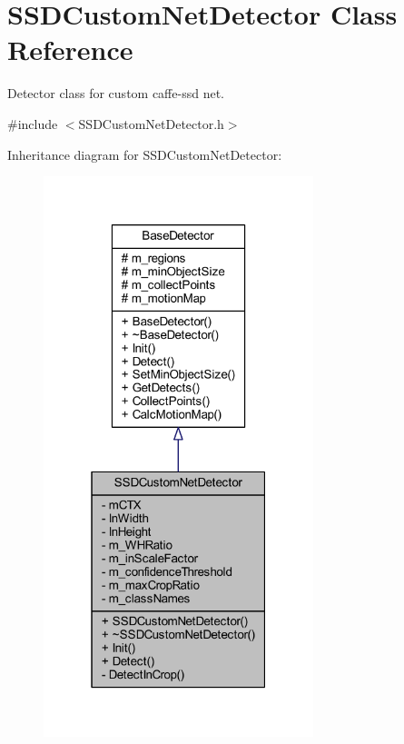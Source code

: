 \hypertarget{class_s_s_d_custom_net_detector}{}\section{S\+S\+D\+Custom\+Net\+Detector Class Reference}
\label{class_s_s_d_custom_net_detector}


Detector class for custom caffe-\/ssd net.  




{\ttfamily \#include $<$S\+S\+D\+Custom\+Net\+Detector.\+h$>$}



Inheritance diagram for S\+S\+D\+Custom\+Net\+Detector\+:\nopagebreak
\begin{figure}[H]
\begin{center}
\leavevmode
\includegraphics[width=223pt]{class_s_s_d_custom_net_detector__inherit__graph}
\end{center}
\end{figure}



